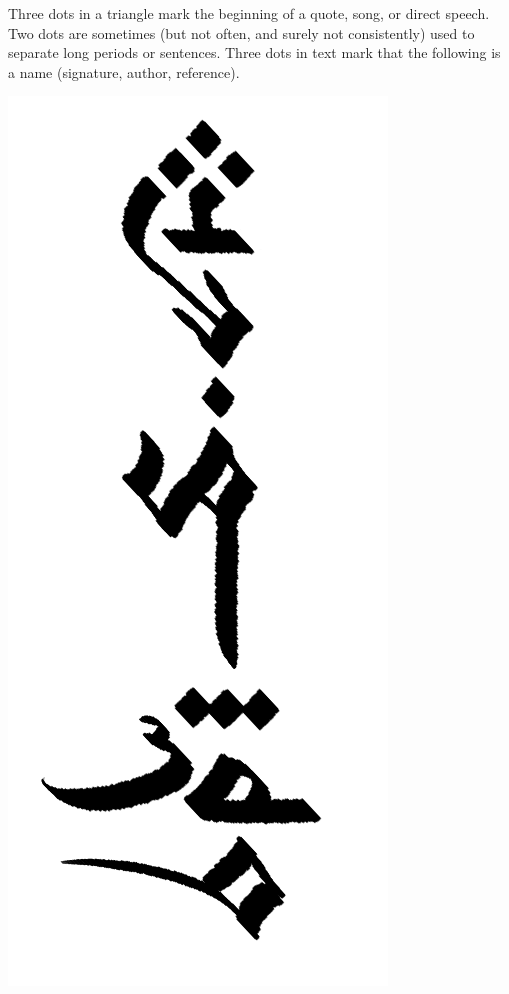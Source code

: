 \documentclass[10pt,oneside]{memoir}
\begin{document}
\vfill
\vspace{-50pt}

\begin{minipage}[]{0.5\textwidth}
    Three dots in a triangle mark the beginning of a quote, song, or direct speech. Two dots are sometimes (but not often, and surely not consistently) used to separate long periods or sentences. Three dots in text mark that the following is a name (signature, author, reference).
\end{minipage}
\hfill
\begin{minipage}[]{0.45\textwidth}
    \centering
    \includegraphics{piss}
\end{minipage}
\end{document}
